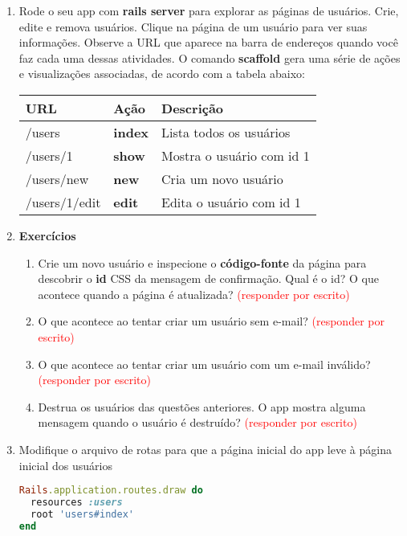 \documentclass[a4paper,12pt]{article}
\begin{document}
\begin{enumerate}
  \item Rode o seu app com \textbf{rails server} para explorar as páginas de usuários. Crie, edite e remova usuários. Clique na página de um usuário para ver suas informações. Observe a URL que aparece na barra de endereços quando você faz cada uma dessas atividades. O comando \textbf{scaffold} gera uma série de ações e visualizações associadas, de acordo com a tabela abaixo:
  \begin{center}
    \begin{tabular}{@{}lll@{}}
      \toprule
      \textbf{URL} & \textbf{Ação} & \textbf{Descrição} \\
      \midrule
      /users & \textbf{index} & Lista todos os usuários \\
      /users/1 & \textbf{show} & Mostra o usuário com id 1 \\
      /users/new & \textbf{new} & Cria um novo usuário \\
      /users/1/edit & \textbf{edit} & Edita o usuário com id 1 \\
      \bottomrule
    \end{tabular}
  \end{center}

  \item \textbf{Exercícios}

    \begin{enumerate}
      \item Crie um novo usuário e inspecione o \textbf{código-fonte} da página para descobrir o \textbf{id} CSS da mensagem de confirmação. Qual é o id? O que acontece quando a página é atualizada? \textcolor{red}{(responder por escrito)}
      \item O que acontece ao tentar criar um usuário sem e-mail? \textcolor{red}{(responder por escrito)}
      \item O que acontece ao tentar criar um usuário com um e-mail inválido? \textcolor{red}{(responder por escrito)}
      \item Destrua os usuários das questões anteriores. O app mostra alguma mensagem quando o usuário é destruído? \textcolor{red}{(responder por escrito)}
    \end{enumerate}

  \item Modifique o arquivo de rotas para que a página inicial do app leve à página inicial dos usuários

    \begin{lstlisting}[language=Ruby, title=config/routes.rb]
Rails.application.routes.draw do
  resources :users
  root 'users#index'
end
    \end{lstlisting}


\end{enumerate}
\end{document}
